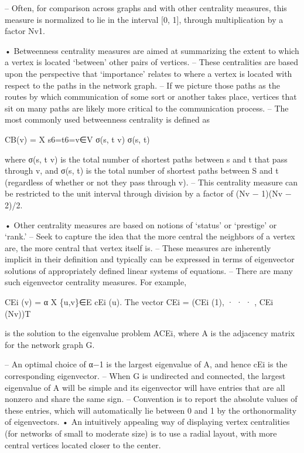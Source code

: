 \documentclass[
]{book}
\begin{document}
{{{-- Often, for comparison across graphs and with other centrality measures, this measure is normalized to lie in the interval {[}0, 1{]}, through multiplication by a factor Nv1.

• Betweenness centrality measures are aimed at summarizing the extent to which a vertex is located `between' other pairs of vertices.
-- These centralities are based upon the perspective that `importance' relates to where a vertex is located with respect to the paths in the network graph.
-- If we picture those paths as the routes by which communication of some sort or another takes place, vertices that sit on many paths are likely more critical to the communication process.
-- The most commonly used betweenness centrality is defined as

CB(v) = X
s6=t6=v∈V
σ(s, t \textbar{} v)
σ(s, t)

where σ(s, t \textbar{} v) is the total number of shortest paths between s and t that pass through v, and σ(s, t) is the total number of shortest paths between S and t (regardless of whether or not they pass through v).
-- This centrality measure can be restricted to the unit interval through division by a factor of (Nv − 1)(Nv − 2)/2.

• Other centrality measures are based on notions of `status' or `prestige' or `rank.'
-- Seek to capture the idea that the more central the neighbors of a vertex are, the more central that vertex itself is.
-- These measures are inherently implicit in their definition and typically can be expressed in terms of eigenvector solutions of appropriately defined linear systems of equations.
-- There are many such eigenvector centrality measures. For example,

CEi
(v) = α
X
\{u,v\}∈E
cEi
(u).
The vector CEi = (CEi
(1), · · · , CEi
(Nv))T

is the solution to the eigenvalue problem ACEi, where A is the adjacency matrix for the network graph G.

-- An optimal choice of α−1 is the largest eigenvalue of A, and hence cEi is the corresponding eigenvector.
-- When G is undirected and connected, the largest eigenvalue of A will be simple and its eigenvector will have entries that are all nonzero and share the same sign.
-- Convention is to report the absolute values of these entries, which will automatically lie between 0 and 1 by the orthonormality of eigenvectors.
• An intuitively appealing way of displaying vertex centralities (for networks of small to moderate size) is to use a radial layout, with more central vertices located closer to the center.

}}}
\end{document}
